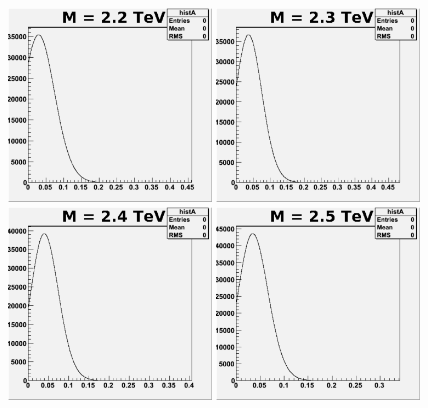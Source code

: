 \begin{figure}[!ht]
  \begin{center}
     \includegraphics[width=0.48\textwidth]{Figures/MCpost2200_6_pe0.pdf}
     \includegraphics[width=0.48\textwidth]{Figures/MCpost2300_6_pe0.pdf}
     \includegraphics[width=0.48\textwidth]{Figures/MCpost2400_6_pe0.pdf}
     \includegraphics[width=0.48\textwidth]{Figures/MCpost2500_6_pe0.pdf}

\end{center}
\end{figure}
